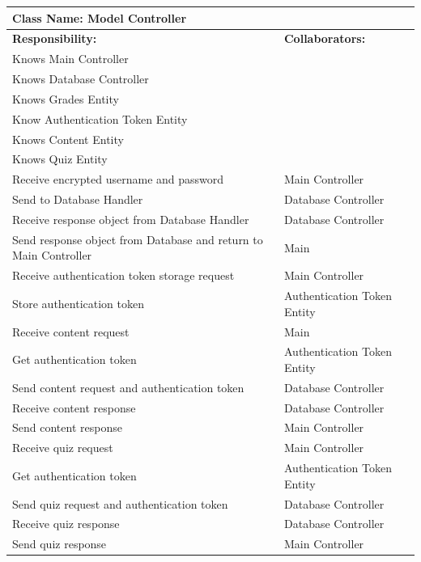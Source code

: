 \documentclass[]{article}
\begin{document}
\begin{enumerate}[a)]

	\begin{table}[H]
	\centering
		\begin{tabular}{|p{5cm}|p{5cm}|}
		\hline
		 \multicolumn{2}{|l|}{\textbf{Class Name: Model Controller}} \\
		\hline
		\textbf{Responsibility:} & \textbf{Collaborators:} \\
		\hline
		Knows Main Controller & \\
		\hline
		Knows Database Controller & \\
		\hline
		Knows Grades Entity & \\
		\hline
		Know Authentication Token Entity & \\
		\hline
		Knows Content Entity & \\
		\hline
		Knows Quiz Entity & \\
		\hline
		Receive encrypted username and password & Main Controller \\
		\hline
		Send to Database Handler & Database Controller \\
		\hline
		Receive response object from Database Handler & Database Controller \\
		\hline
		Send response object from Database and return to Main Controller & Main \\
		\hline
		Receive authentication token storage request & Main Controller \\
		\hline
		Store authentication token & Authentication Token Entity \\
		\hline
		Receive content request & Main \\
		\hline
		Get authentication token & Authentication Token Entity \\
		\hline
		Send content request and authentication token & Database Controller \\
		\hline
		Receive content response & Database Controller \\
		\hline
		Send content response & Main Controller \\
		\hline
		Receive quiz request & Main Controller \\
		\hline
		Get authentication token & Authentication Token Entity \\
		\hline
		Send quiz request and authentication token & Database Controller\\
		\hline
		Receive quiz response & Database Controller \\
		\hline
		Send quiz response & Main Controller \\

\end{tabular}
\end{table}
\end{enumerate}
\end{document}
